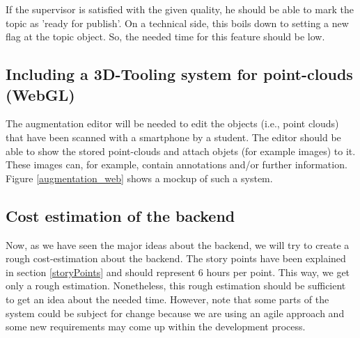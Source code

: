 If the supervisor is satisfied with the given quality, he should be able to mark the topic as 'ready for publish'. On a technical side, this boils down to setting a new flag at the topic object. So, the needed time for this feature should be low.

\subsection{Including a 3D-Tooling system for point-clouds (WebGL)}
The augmentation editor will be needed to edit the objects (i.e., point clouds) that have been scanned with a smartphone by a student.
The editor should be able to show the stored point-clouds and attach objets (for example images) to it. These images can, for example, contain annotations and/or further information. Figure \ref{augmentation_web} shows a mockup of such a system. 

\subsection{Cost estimation of the backend}
\label{backendEstimation}
Now, as we have seen the major ideas about the backend, we will try to create a rough cost-estimation about the backend. The story points have been explained in section \ref{storyPoints} and should represent 6 hours per point. This way, we get only a rough estimation. Nonetheless, this rough estimation should be sufficient to get an idea about the needed time. However, note that some parts of the system could be subject for change because we are using an agile approach and some new requirements may come up within the development process.

